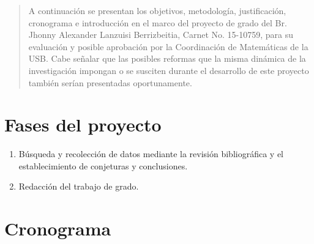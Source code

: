 \documentclass[12pt]{article}
\begin{document}
    \maketitle
    \thispagestyle{empty}

    \begin{abstract}
        A continuación se presentan los objetivos, metodología, justificación,
        cronograma e introducción en el marco del proyecto de grado del
        Br. Jhonny Alexander Lanzuisi Berrizbeitia, Carnet No. 15-10759, para su
        evaluación y posible aprobación por la Coordinación de Matemáticas de
        la USB. Cabe señalar que las posibles reformas que la misma dinámica
        de la investigación impongan o se susciten durante el desarrollo de
        este proyecto también serían presentadas oportunamente.
    \end{abstract}

    \section{Fases del proyecto}

    \begin{enumerate}[label=\Roman*.]
        \item Búsqueda y recolección de datos mediante la revisión
              bibliográfica y el establecimiento de conjeturas y conclusiones.
        \item Redacción del trabajo de grado.
    \end{enumerate}

    \section{Cronograma}
\end{document}
